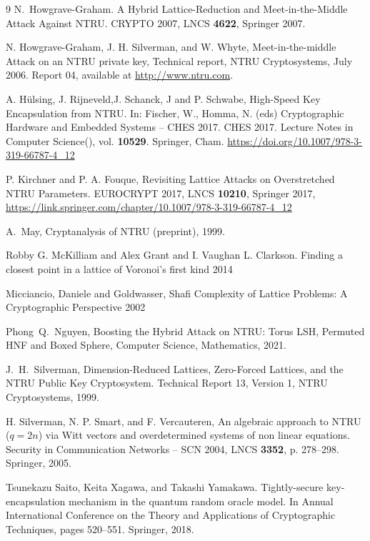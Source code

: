 \documentclass{amsart}
\numberwithin{equation}{section}
\begin{document}
{\begin{thebibliography}{9}
 N.~Howgrave-Graham. A Hybrid Lattice-Reduction and Meet-in-the-Middle Attack Against NTRU. CRYPTO 2007, LNCS {\bf 4622}, Springer 2007. 

 N. Howgrave-Graham, J. H. Silverman, and W. Whyte, Meet-in-the-middle Attack on an NTRU private key, Technical report, NTRU Cryptosystems, July 2006. Report  04, available at \url{http://www.ntru.com}.
 
 A. Hülsing, J. Rijneveld,J. Schanck, J and P. Schwabe, High-Speed Key Encapsulation from NTRU. In: Fischer, W., Homma, N. (eds) 
Cryptographic Hardware and Embedded Systems – CHES 2017. CHES 2017. Lecture 
Notes in Computer Science(), vol. {\bf 10529}. Springer, Cham. \url{https://doi.org/10.1007/978-3-319-66787-4\_12}

 P. Kirchner and P. A. Fouque, Revisiting Lattice Attacks on Overstretched NTRU Parameters. EUROCRYPT 2017, LNCS {\bf 10210}, Springer 2017, \url{https://link.springer.com/chapter/10.1007/978-3-319-66787-4_12}

  A.~May, Cryptanalysis of NTRU (preprint), 1999.

 Robby G. McKilliam and Alex Grant and I. Vaughan L. Clarkson. Finding a closest point in a lattice of Voronoi's first kind 2014

 Micciancio, Daniele and Goldwasser, Shafi Complexity of Lattice Problems: A Cryptographic Perspective 2002

  Phong~Q.~Nguyen, Boosting the Hybrid Attack on NTRU: Torus LSH, Permuted HNF and Boxed Sphere, Computer Science, Mathematics, 2021.

 J.~H.~Silverman, Dimension-Reduced Lattices, Zero-Forced Lattices, and the NTRU Public Key Cryptosystem. Technical Report 13, Version 1, NTRU Cryptosystems, 1999.

 H. Silverman, N. P. Smart, and F. Vercauteren, An algebraic approach to NTRU ($q = 2n$) via Witt vectors and overdetermined systems of non linear equations. Security in Communication Networks -- SCN 2004, LNCS {\bf 3352}, p. 278--298. Springer, 2005.

 Tsunekazu Saito, Keita Xagawa, and Takashi Yamakawa. Tightly-secure key-encapsulation mechanism in the quantum random oracle model. In Annual International Conference on the Theory and Applications of Cryptographic Techniques, pages 520--551. Springer, 2018.


\end{thebibliography}}
\end{document}
